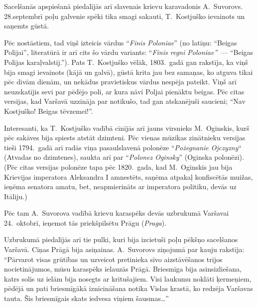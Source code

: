 \documentclass[twoside,a5paper,12pt,fleqn,openany]{extbook}
\newcommand{\pltxti}[1]{\textit{\textpolish{#1}}}
\newcommand{\latxti}[1]{\textit{\textlatin{#1}}}
\begin{document}
Sacelšanās apspiešanā piedalījās arī slavenais krievu karavadonis A.~Suvorovs. 28.septembrī poļu galvenie spēki tika smagi sakauti, T.~Kostjuško ievainots un saņemts gūstā.

Pēc nostāstiem, tad viņš izteicis vārdus ``\latxti{Finis Poloniae}'' (no latīņu: ``Beigas Polijai'', literatūrā ir arī cits šo vārdu variants: ``\latxti{Finis regni Poloniae''}~--- ``Beigas Polijas karaļvalstij.''). Pats T.~Kostjuško vēlāk, 1803.~gadā gan rakstīja, ka viņš bija smagi ievainots (kājā un galvā), gūstā krita jau bez samaņas, ko atguva tikai pēc divām dienām, un nekādus pravietiskus vārdus nespēja pateikt. Viņš arī neuzskatījis sevi par pēdējo poli, ar kura nāvi Poljai pienāktu beigas. Pēc citas versijas, kad Varšavā uzzināja par notikušo, tad gan atskanējuši saucieni; ``Nav Kostjuško! Beigas tēvzemei!''.

Interesanti, ka T.~Kostjuško vadībā cīnījās arī jauns virsnieks M.~Oginskis, kurš pēc sakāves bija spiests atstāt dzimteni. Pēc vienas mūzikas zinātnieku versijas tieši 1794.~gadā arī radās viņa pasaulslavenā polonēze ``\pltxti{Pożegnanie Ojczyzny}`` (Atvadas no dzimtenes), saukta arī par ``\pltxti{Polonez Oginsky}'' (Oginska polonēzi). (Pēc citas versijas polonēze tapa pēc 1820.~gada, kad M.~Oginskis jau bija Krievijas imperatora Aleksandra I amnestēts, saņēma atpakaļ konfiscētās muižas, ieņēma senatora amatu, bet, neapmierināts ar imperatora politiku, devās uz Itāliju.)

Pēc tam A.~Suvorova vadībā krievu karaspēks devās uzbrukumā Varšavai 24.~oktobrī, ieņemot tās priekšpilsētu Prāgu (\pltxti{Praga}).

Uzbrukumā piedalījās arī tie pulki, kuri bija izcietuši poļu pēkšņo sacelšanos Varšavā. Cīņas Prāgā bija asiņainas. A.~Suvorovs ziņojumā par kauju rakstīja: ``Pārvarot visas grūtības un uzveicot pretinieka sīvo aizstāvēšanos trijos nocietinājumos, mūsu karaspēks ielauzās Prāgā. Briesmīga bija asinsizliešana, katrs solis uz ielām bija nosegts ar kritušajiem. Visi laukumu noklāti ķermeņiem, pēdējā un pati briesmīgākā iznīcināšana notika Vislas krastā, ko redzēja Varšavas tauta. Šis briesmīgais skats iedvesa viņiem šausmas…''
\end{document}
